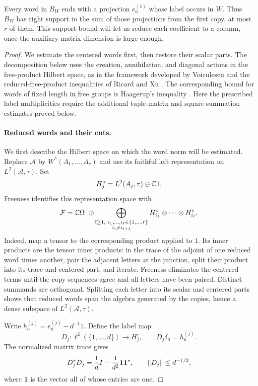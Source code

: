 Every word in $B_W$ ends with a projection $e_a^{(1)}$ whose label
occurs in $W$. Thus $B_W$ has right support in the sum of those
projections from the first copy, at most $r$ of them. This support
bound will let us reduce each coefficient to a column, once the
auxiliary matrix dimension is large enough.

\begin{proof}
We estimate the centered words first, then restore their scalar parts.
The decomposition below uses the creation, annihilation, and diagonal
actions in the free-product Hilbert space, as in the framework developed by
Voiculescu \cite{Voiculescu1985} and the reduced-free-product inequalities of
Ricard and Xu \cite[Section~1 and Fact~2.6]{RicardXu2006}.
The corresponding bound for words of fixed length in free groups is
Haagerup's inequality \cite[Lemma~1.4]{Haagerup1979}.
Here the prescribed label multiplicities require the additional tuple-matrix
and square-summation estimates proved below.

\paragraph{Reduced words and their cuts.}
We first describe the Hilbert space on which the word norm will be
estimated.  Replace $\mathcal A$ by $W^*(A_1,\ldots,A_r)$ and use its
faithful left representation on $L^2(\mathcal A,\tau)$.  Set
\[
 H_j^\circ=L^2(A_j,\tau)\ominus\mathbb C1.
\]
Freeness identifies this representation space with
\begin{equation}\label{eq:fw-fock}
 \mathcal F=\mathbb C\Omega\ \oplus\!
 \bigoplus_{\substack{\ell\geq1,\ i_1,\ldots,i_\ell\in\{1,\ldots,r\}\\
                      i_t\ne i_{t+1}}}
 H_{i_1}^\circ\otimes\cdots\otimes H_{i_\ell}^\circ.
\end{equation}
Indeed, map a tensor to the corresponding product applied to $1$.
Its inner products are the tensor inner products: in the trace of the
adjoint of one reduced word times another, pair the adjacent letters
at the junction, split their product into its trace and centered part,
and iterate.  Freeness eliminates the centered terms until the copy
sequences agree and all letters have been paired.  Distinct summands
are orthogonal.  Splitting each letter into its scalar and centered
parts shows that reduced words span the algebra generated by the
copies, hence a dense subspace of $L^2(\mathcal A,\tau)$.

Write $h_a^{(j)}=e_a^{(j)}-d^{-1}1$.  Define the label map
\[
 D_j:\ell^2(\{1,\ldots,d\})\longrightarrow H_j^\circ,
 \qquad D_j\delta_a=h_a^{(j)}.
\]
The normalized matrix trace gives
\begin{equation}\label{eq:fw-label-map}
 D_j^*D_j=\frac1d I-\frac1{d^2}\mathbf1\mathbf1^*,
 \qquad \lVert D_j\rVert\leq d^{-1/2},
\end{equation}
where $\mathbf1$ is the vector all of whose entries are one.


\end{proof}
